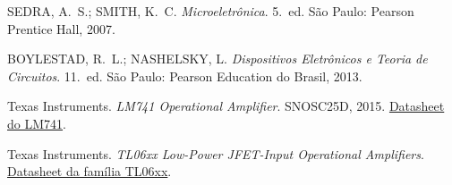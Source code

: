 \documentclass[11pt,a4paper]{article}
\begin{document}
\begin{referencias}
\item SEDRA, A.~S.; SMITH, K.~C. \emph{Microeletrônica}. 5.~ed. São Paulo: Pearson
      Prentice Hall, 2007.
\item BOYLESTAD, R.~L.; NASHELSKY, L. \emph{Dispositivos Eletrônicos e Teoria de
      Circuitos}. 11.~ed. São Paulo: Pearson Education do Brasil, 2013.
\item Texas Instruments. \emph{LM741 Operational Amplifier}. SNOSC25D, 2015.
\href{https://www.ti.com/lit/ds/symlink/lm741.pdf}{Datasheet do LM741}.
\item Texas Instruments. \emph{TL06xx Low-Power JFET-Input Operational Amplifiers}.
\href{https://www.ti.com/lit/ds/symlink/tl064.pdf}{Datasheet da família TL06xx}.
\end{referencias}
\end{document}
